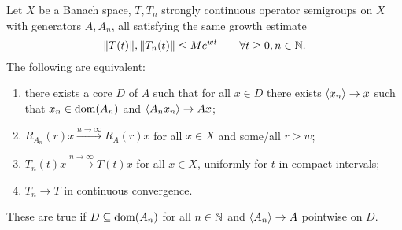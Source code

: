 \begin{theorem}
Let $X$ be a Banach space, $T, T_n$ strongly continuous operator semigroups on $X$ with generators $A, A_n$, all satisfying the same growth estimate
\[ \lVert T(t)\rVert, \lVert T_n(t)\rVert \leq Me^{wt} \qquad \forall t\geq 0, n\in \mathbb{N}. \]
The following are equivalent:
\begin{enumerate}
\item there exists a core $D$ of $A$ such that for all $x\in D$ there exists $\left\langle x_n \right\rangle \to x$ such that $x_n\in\operatorname{dom}(A_n)$ and $\left\langle A_nx_n \right\rangle\to Ax$;
\item $R_{A_n}(r)x \overset{n\to\infty}{\longrightarrow} R_{A}(r)x$ for all $x\in X$ and some/all $r>w$;
\item $T_n(t)x\overset{n\to\infty}{\longrightarrow} T(t)x$ for all $x\in X$, uniformly for $t$ in compact intervals;
\item $T_n \to T$ in continuous convergence.
\end{enumerate}
These are true if $D\subseteq \operatorname{dom}(A_n)$ for all $n\in\mathbb{N}$ and $\left\langle A_n \right\rangle\to A$ pointwise on $D$.
\end{theorem}

